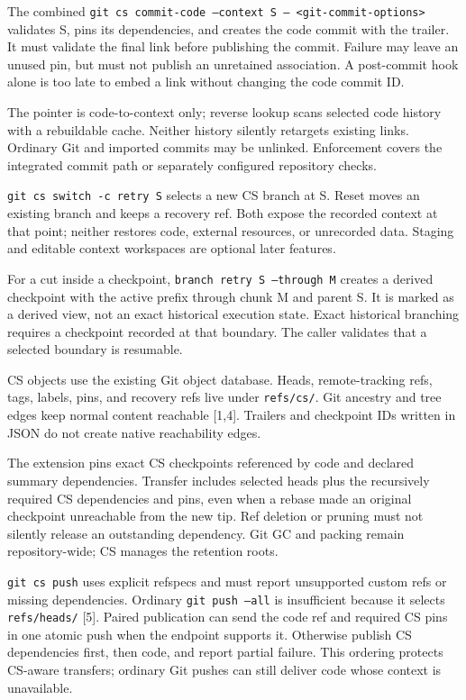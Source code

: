 \documentclass[11pt,letterpaper]{article}
\newcommand{\sect}[1]{\vspace{5pt}{\large\bfseries\textcolor{ink}{#1}}\par\vspace{1pt}}
\newcommand{\subsect}[1]{\vspace{3pt}{\bfseries\textcolor{ink}{#1}}\par}
\newcommand{\code}[1]{{\small\texttt{#1}}}
\begin{document}
The combined \code{git cs commit-code --context S -- <git-commit-options>}
validates S, pins its dependencies, and creates the code commit with the trailer.
It must validate the final link before publishing the commit. Failure may leave
an unused pin, but must not publish an unretained association. A post-commit
hook alone is too late to embed a link without changing the code commit ID.

The pointer is code-to-context only; reverse lookup scans selected code history
with a rebuildable cache. Neither history silently retargets existing links.
Ordinary Git and imported commits may be unlinked. Enforcement covers the
integrated commit path or separately configured repository checks.

\subsect{Historical branching}
\code{git cs switch -c retry S} selects a new CS branch at S. Reset moves an
existing branch and keeps a recovery ref. Both expose the recorded context at
that point; neither restores code, external resources, or unrecorded data.
Staging and editable context workspaces are optional later features.

For a cut inside a checkpoint, \code{branch retry S --through M} creates a
derived checkpoint with the active prefix through chunk M and parent S.
It is marked as a derived view, not an exact historical execution state.
Exact historical branching requires a checkpoint recorded at that boundary.
The caller validates that a selected boundary is resumable.

\newpage
\sect{5. Retention, transfer, and delivery}
\subsect{Refs and dependency closure}
CS objects use the existing Git object database. Heads, remote-tracking refs,
tags, labels, pins, and recovery refs live under \code{refs/cs/}. Git ancestry
and tree edges keep normal content reachable [1,4]. Trailers and checkpoint
IDs written in JSON do not create native reachability edges.

The extension pins exact CS checkpoints referenced by code and declared
summary dependencies. Transfer includes selected heads plus the recursively
required CS dependencies and pins, even when a rebase made an original
checkpoint unreachable from the new tip. Ref deletion or pruning must not
silently release an outstanding dependency. Git GC and packing remain
repository-wide; CS manages the retention roots.

\code{git cs push} uses explicit refspecs and must report unsupported custom
refs or missing dependencies. Ordinary \code{git push --all} is insufficient
because it selects \code{refs/heads/} [5]. Paired publication can send the code
ref and required CS pins in one atomic push when the endpoint supports it.
Otherwise publish CS dependencies first, then code, and report partial failure.
This ordering protects CS-aware transfers; ordinary Git pushes can still
deliver code whose context is unavailable.
\end{document}
